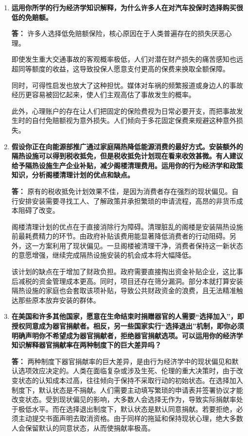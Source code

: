 \begin{enumerate}[label=\textbf{\arabic*.}, leftmargin=*]
		提高工资属于收益框架。工人很快会把高工资视为理所应当的收入基准线，其长期激励效果会随着时间推移而逐渐减弱。
		
		相比之下，超额奖金属于条件激励。如果将奖金设计为达到特定绩效才能获得，或者预先发放并在未达标时收回，就能充分利用工人的损失厌恶心理。
		
		由于人类对失去已有财富的痛苦感远大于获得同等财富的快乐感，为了避免奖金被收回，工人会付出更多的努力，从而有效提高产出。
		
		\item \textbf{运用你所学的行为经济学知识解释，为什么许多人在对汽车投保时选择购买很低的免赔额。}
		
		\textbf{答：}
		许多人选择低免赔额保险，核心原因在于人类普遍存在的损失厌恶心理。
		
		即使发生重大交通事故的客观概率极低，人们对潜在财产损失的痛苦感知也远超同等额度的收益，这导致投保人愿意支付更高的保费来换取全额保障。
		
		同时，可得性启发也放大了这种担忧。媒体对车祸的频繁报道或身边人的事故经历更容易被回忆起来，使人们主观高估了事故发生的概率。
		
		此外，心理账户的存在让人们把固定的保险费视为日常必要开支，而把事故发生时的自付免赔额视为意外损失。人们倾向于多花固定保费来规避这种意外损失。
		
		\item \textbf{假设你正在向能源部推广通过家庭隔热降低能源消费的最好方式。安装额外的隔热设施可以得到税收抵免，但是税收抵免计划现在看来收效甚微。有人建议给予隔热设施生产企业补贴，减少阁楼清理费用。运用你的行为经济学和政策知识，分析阁楼清理计划的优点和缺点。}
		
		\textbf{答：}
		原有的税收抵免计划效果不佳，是因为消费者存在强烈的现状偏见。自行安排安装需要寻找工人、了解政策并承担繁琐的申请流程，高昂的非货币成本阻碍了改变。
		
		阁楼清理计划的优点在于直接消除行为障碍。清理脏乱的阁楼是安装隔热设施前最耗费精力的环节。由政府补贴该费用能显著降低消费者的行动阻碍。另外，这一方案利用了现状偏见。一旦阁楼被清理干净，消费者保持这一新状态的意愿增强，继续完成隔热设施安装的机会成本将大幅降低。
		
		该计划的缺点在于增加了财政负担。政府需要直接掏出资金补贴企业，这比事后减税的资金管理成本更高。同时，项目还存在筛分漏洞。部分本就打算安装隔热设施的家庭也会套取该项补贴，导致公共财政资金的浪费，且无法精准触达那些原本放弃安装的群体。
		
		\item \textbf{在美国和许多其他国家，愿意在生命结束时捐赠器官的人需要“选择加入”，即授权同意成为器官捐献者。相反，另一些国家实行“选择退出”机制，即你必须明确声明你不希望成为器官捐献者，拒绝器官捐献选项。可以运用你的经济学知识解释器官捐献率在两种制度下的巨大差异吗？}
		
		\textbf{答：}
		两种制度下器官捐献率的巨大差异，是由行为经济学中的现状偏见和默认选项效应决定的。人类在面临复杂或涉及生死、伦理的重大决策时，由于改变状态的认知成本过高，往往倾向于保持不采取行动的初始状态。在选择加入制度下，默认状态是不捐献。人们需要主动填写繁琐的申请表并签署协议才能改变状态。受到现状偏见的影响，大多数人会选择无作为，导致实际捐献率处于极低水平。而在选择退出制度下，默认状态是默认同意捐献。若要拒绝，必须主动提交书面声明去取消资格。由于同样的拖延和保持现状心理，绝大多数人会保留默认的同意状态，从而使捐献率极高。
	\end{enumerate}